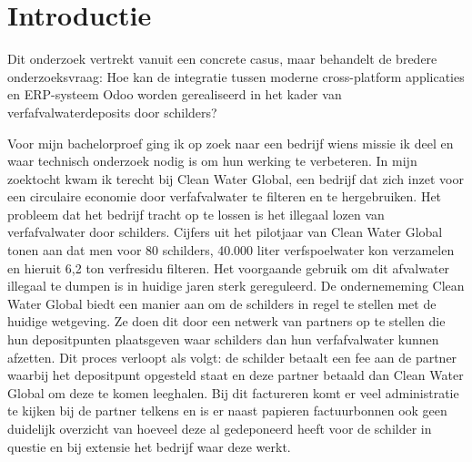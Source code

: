  
 
 
 
 
 
 

\section{Introductie}%
\label{sec:introductie}

Dit onderzoek vertrekt vanuit een concrete casus, 
maar behandelt de bredere onderzoeksvraag: 
Hoe kan de integratie tussen moderne cross-platform applicaties en ERP-systeem Odoo worden gerealiseerd in het kader van verfafvalwaterdeposits door schilders?

\bigskip
Voor mijn bachelorproef ging ik op zoek naar een bedrijf wiens missie ik deel 
en waar technisch onderzoek nodig is om hun werking te verbeteren.
In mijn zoektocht kwam ik terecht bij Clean Water Global, 
een bedrijf dat zich inzet voor een circulaire economie door verfafvalwater te filteren en te hergebruiken.
Het probleem dat het bedrijf tracht op te lossen is het illegaal lozen van verfafvalwater door schilders.
Cijfers uit het pilotjaar van Clean Water Global tonen aan dat men voor 80 schilders, 40.000 liter verfspoelwater kon verzamelen en hieruit 6,2 ton verfresidu filteren.
Het voorgaande gebruik om dit afvalwater illegaal te dumpen is in huidige jaren sterk gereguleerd. 
De ondernememing Clean Water Global biedt een manier aan om de schilders in regel te stellen met de huidige wetgeving.
Ze doen dit door een netwerk van partners op te stellen die hun depositpunten plaatsgeven waar schilders dan hun verfafvalwater kunnen afzetten.
Dit proces verloopt als volgt: de schilder betaalt een fee aan de partner waarbij het depositpunt opgesteld staat en deze partner betaald dan Clean Water Global om deze te komen leeghalen.
Bij dit factureren komt er veel administratie te kijken bij de partner telkens en 
is er naast papieren factuurbonnen ook geen duidelijk overzicht van hoeveel deze al gedeponeerd heeft 
voor de schilder in questie en bij extensie het bedrijf waar deze werkt.

